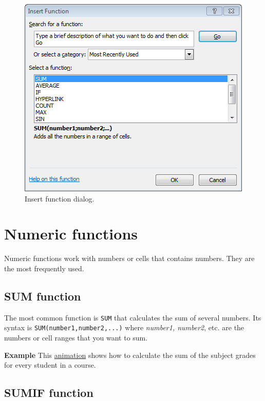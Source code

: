 \begin{figure}[htbp]
\begin{center}
\includegraphics[scale=0.7]{../img/dialog_insert_function.png}
\end{center}
\caption{Insert function dialog.}
\label{img-dialog_insert_function}
\end{figure}



\section{Numeric functions}\label{numericfunctions}
Numeric functions work with numbers or cells that contains numbers. They are the most frequently used. 


\subsection{SUM function}\hypertarget{sum-function}{}\label{sum-function}

The most common function is \texttt{SUM} that calculates the sum of several numbers. Its syntax is
\texttt{SUM(number1,number2,...)} where \emph{number1, number2}, etc. are the numbers or cell ranges that you want to
sum.

\textbf{Example} This \href{http://aprendeconalf.es/office/excel/manual/img/example_function_sum.gif}{animation} shows how to calculate the sum of the subject grades for every student in a course.

\subsection{SUMIF function}\hypertarget{sumif-function}{}\label{sumif-function}

